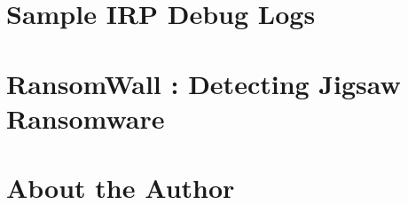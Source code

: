 
\appendix

\chapter{Sample IRP Debug Logs}

\chapter{RansomWall : Detecting Jigsaw Ransomware}


\chapter*{About the Author}
